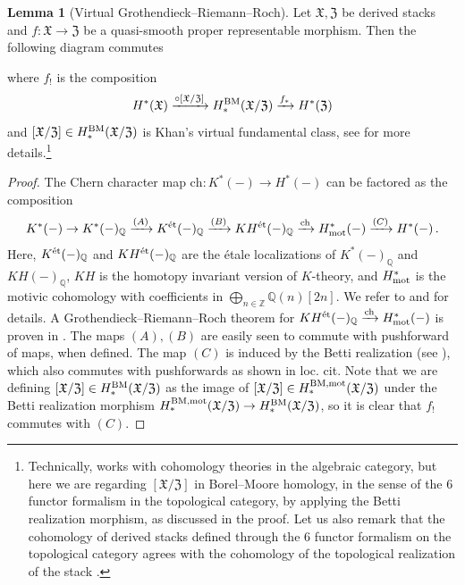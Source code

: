 \documentclass[12pt]{amsart}
\theoremstyle{definition}
\newtheorem{lemma}[definition]{Lemma}
\newcommand{\BQ}{{\mathbb{Q}}}
\newcommand{\BZ}{{\mathbb{Z}}}
\newcommand{\1}{\mathbf 1}
\newcommand{\FX}{{\mathfrak{X}}}
\newcommand{\FZ}{{\mathfrak{Z}}}
\newcommand{\ch}{\mathrm{ch}}
\begin{document}
\begin{lemma}[Virtual Grothendieck--Riemann--Roch]\label{lem: GRR}
Let $\FX, \FZ$ be derived stacks and $f\colon \FX\to \FZ$ be a quasi-smooth proper representable morphism. Then the following diagram commutes
\begin{center}
\end{center}
where $f_!$ is the composition
\[H^\ast(\FX)\xrightarrow{\circ [\FX/\FZ]} H_\ast^{\textup{BM}}(\FX/\FZ)\xrightarrow{f_\ast} H^\ast(\FZ)\]
and $[\FX/\FZ]\in H_\ast^{\textup{BM}}(\FX/\FZ)$ is Khan's virtual fundamental class, see \cite[Section 3.4]{khanVFC} for more details.\footnote{Technically, \cite{khanVFC} works with cohomology theories in the algebraic category, but here we are regarding $[\FX/\FZ]$ in Borel--Moore homology, in the sense of the 6 functor formalism in the topological category, by applying the Betti realization morphism, as discussed in the proof. Let us also remark that the cohomology of derived stacks defined through the 6 functor formalism on the topological category agrees with the cohomology of the topological realization of the stack \cite[Proposition 2.8]{khanequivcoh}.}
\end{lemma}
\begin{proof}
    The Chern character map $\ch\colon K^\ast(-)\to H^\ast(-)$ can be factored as the composition
    \[K^\ast(-)\rightarrow K^\ast(-)_\BQ\xrightarrow{(A)} K^{\textup{ét}}(-)_\BQ\xrightarrow{(B)} KH^{\textup{ét}}(-)_\BQ\xrightarrow{\ch} H^\ast_{\textup{mot}}(-)\xrightarrow{(C)} H^\ast(-)\,.\]
Here, $K^{\textup{ét}}(-)_\BQ$ and $KH^{\textup{ét}}(-)_\BQ$ are the étale localizations of $K^{\ast}(-)_\BQ$ and $KH(-)_\BQ$, $KH$ is the homotopy invariant version of $K$-theory, and $H^\ast_{\textup{mot}}$ is the motivic cohomology with coefficients in $\bigoplus_{n\in \BZ}\BQ(n)[2n]$. We refer to \cite[Sections 4, 5]{khan} and \cite[Example 2.10, 2.13]{khanVFC} for details. A Grothendieck--Riemann--Roch theorem for $KH^{\textup{ét}}(-)_\BQ\xrightarrow{\ch} H^\ast_{\textup{mot}}(-)$ is proven in \cite[Corollary 3.25]{khanVFC}. The maps $(A), (B)$ are easily seen to commute with pushforward of maps, when defined. The map $(C)$ is induced by the Betti realization (see \cite[Section 2]{ayoub}), which also commutes with pushforwards as shown in loc. cit. Note that we are defining $[\FX/\FZ]\in H^{\textup{BM}}_\ast(\FX/\FZ)$ as the image of $[\FX/\FZ]\in H^{\textup{BM,mot}}_\ast(\FX/\FZ)$ under the Betti realization morphism  $H^{\textup{BM,mot}}_\ast(\FX/\FZ)\to  H^{\textup{BM}}_\ast(\FX/\FZ)$, so it is clear that $f_!$ commutes with $(C)$. 
\end{proof}
\end{document}
